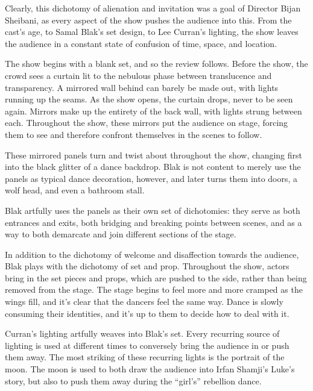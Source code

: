 \documentclass[12pt]{article}[titlepage]
\newcommand{\say}[1]{``#1''}
\newcommand{\1}{\={a}}
\newcommand{\2}{\={e}}
\newcommand{\3}{\={\i}}
\newcommand{\4}{\=o}
\newcommand{\5}{\=u}
\newcommand{\6}{\={A}}
\renewcommand{\,}{\textsuperscript{,}}
\begin{document}
Clearly, this dichotomy of alienation and invitation was a goal of Director Bijan Sheibani, as every aspect of the show pushes the audience into this.
From the cast's age, to Samal Blak's set design, to Lee Curran's lighting, the show leaves the audience in a constant state of confusion of time, space, and location.

The show begins with a blank set, and so the review follows.
Before the show, the crowd sees a curtain lit to the nebulous phase between translucence and transparency.
A mirrored wall behind can barely be made out, with lights running up the seams.
As the show opens, the curtain drops, never to be seen again.
Mirrors make up the entirety of the back wall, with lights strung between each.
Throughout the show, these mirrors put the audience on stage, forcing them to see and therefore confront themselves in the scenes to follow.

These mirrored panels turn and twist about throughout the show, changing first into the black glitter of a dance backdrop.
Blak is not content to merely use the panels as typical dance decoration, however, and later turns them into doors, a wolf head, and even a bathroom stall.

Blak artfully uses the panels as their own set of dichotomies: they serve as both entrances and exits, both bridging and breaking points between scenes, and as a way to both demarcate and join different sections of the stage.

In addition to the dichotomy of welcome and disaffection towards the audience, Blak plays with the dichotomy of set and prop.
Throughout the show, actors bring in the set pieces and props, which are pushed to the side, rather than being removed from the stage.
The stage begins to feel more and more cramped as the wings fill, and it's clear that the dancers feel the same way.
Dance is slowly consuming their identities, and it's up to them to decide how to deal with it.

Curran's lighting artfully weaves into Blak's set.
Every recurring source of lighting is used at different times to conversely bring the audience in or push them away.
The most striking of these recurring lights is the portrait of the moon.
The moon is used to both draw the audience into Irfan Shamji's Luke's story, but also to push them away during the \say{girl's} rebellion dance.
\end{document}

